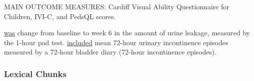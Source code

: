 \documentclass[a4paper]{ctexbook}
\begin{document}
    \begin{eg}[label={eg:2s5-1}]{}
      MAIN OUTCOME MEASURES: Cardiff Visual Ability Questionnaire for Children, IVI-C, and PedsQL scores.
    \end{eg}

    \begin{eg}[label={eg:2s5-2}]{}
       \uline{was} change from baseline to week 6 in the amount of urine leakage, measured by the 1-hour pad test.  \uline{included} mean 72-hour urinary incontinence episodes measured by a 72-hour bladder diary (72-hour incontinence episodes).
    \end{eg}

    \subsubsection{Lexical Chunks}
\end{document}
